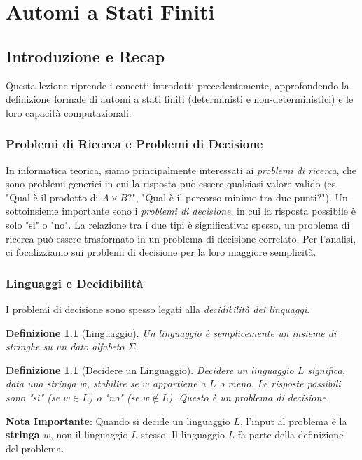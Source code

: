 \documentclass[a4paper, 11pt]{book} %
\newtheorem{definition}[theorem]{Definizione}
\theoremstyle{definition}
\begin{document}
\chapter{Automi a Stati Finiti}



\section{Introduzione e Recap}
Questa lezione riprende i concetti introdotti precedentemente, approfondendo la definizione formale di automi a stati finiti (deterministi e non-deterministici) e le loro capacità computazionali.

\subsection{Problemi di Ricerca e Problemi di Decisione}
In informatica teorica, siamo principalmente interessati ai \emph{problemi di ricerca}, che sono problemi generici in cui la risposta può essere qualsiasi valore valido (es. "Qual è il prodotto di $A \times B$?", "Qual è il percorso minimo tra due punti?").
Un sottoinsieme importante sono i \emph{problemi di decisione}, in cui la risposta possibile è solo "sì" o "no".
La relazione tra i due tipi è significativa: spesso, un problema di ricerca può essere trasformato in un problema di decisione correlato. Per l'analisi, ci focalizziamo sui problemi di decisione per la loro maggiore semplicità.

\subsection{Linguaggi e Decidibilità}
I problemi di decisione sono spesso legati alla \emph{decidibilità dei linguaggi}.
\begin{definition}[Linguaggio]
Un \emph{linguaggio} è semplicemente un insieme di stringhe su un dato alfabeto $\Sigma$.
\end{definition}

\begin{definition}[Decidere un Linguaggio]
\emph{Decidere un linguaggio $L$} significa, data una stringa $w$, stabilire se $w$ appartiene a $L$ o meno. Le risposte possibili sono "sì" (se $w \in L$) o "no" (se $w \notin L$). Questo è un problema di decisione.
\end{definition}

\noindent \textbf{Nota Importante}: Quando si decide un linguaggio $L$, l'input al problema è la \textbf{stringa $w$}, non il linguaggio $L$ stesso. Il linguaggio $L$ fa parte della definizione del problema.
\end{document}
